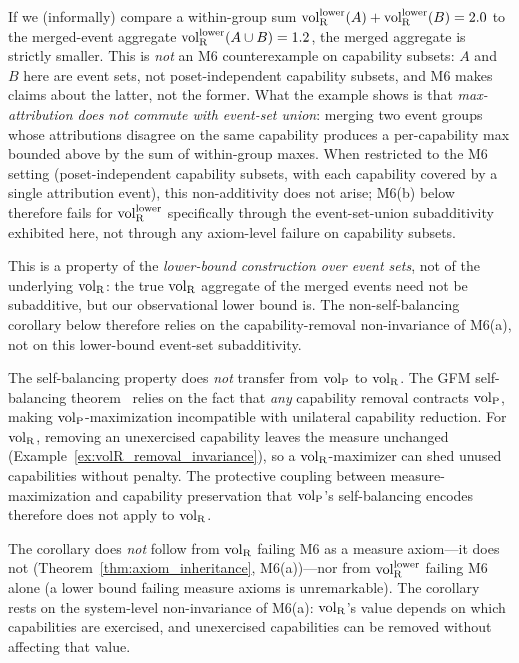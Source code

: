 \begin{example}
If we (informally) compare a within-group sum
${\operatorname{vol}_{\mathrm{R}}^{\mathrm{lower}}}(A) + {\operatorname{vol}_{\mathrm{R}}^{\mathrm{lower}}}(B) = 2.0$ to the merged-event
aggregate ${\operatorname{vol}_{\mathrm{R}}^{\mathrm{lower}}}(A \cup B) = 1.2$, the merged aggregate
is strictly smaller.  This is \emph{not} an M6 counterexample
on capability subsets: $A$ and $B$ here are event sets, not
poset-independent capability subsets, and M6 makes claims
about the latter, not the former.  What the example shows is
that \emph{max-attribution does not commute with event-set
union}: merging two event groups whose attributions disagree
on the same capability produces a per-capability max bounded
above by the sum of within-group maxes.  When restricted to
the M6 setting (poset-independent capability subsets, with
each capability covered by a single attribution event), this
non-additivity does not arise; M6(b) below therefore fails for
${\operatorname{vol}_{\mathrm{R}}^{\mathrm{lower}}}$ specifically through the event-set-union
subadditivity exhibited here, not through any axiom-level
failure on capability subsets.

This is a property of the \emph{lower-bound construction over
event sets}, not of the underlying ${\operatorname{vol}_{\mathrm{R}}}$: the true ${\operatorname{vol}_{\mathrm{R}}}$
aggregate of the merged events need not be subadditive, but
our observational lower bound is.  The non-self-balancing
corollary below therefore relies on the capability-removal
non-invariance of M6(a), not on this lower-bound
event-set subadditivity.
\end{example}

\begin{corollary}
\label{cor:not_self_balancing}
The self-balancing property does \emph{not} transfer from
${\operatorname{vol}_{\mathrm{P}}}$ to ${\operatorname{vol}_{\mathrm{R}}}$.  The GFM self-balancing
theorem~\citep[Theorem~1]{lasser2026poset} relies on the fact
that \emph{any} capability removal contracts ${\operatorname{vol}_{\mathrm{P}}}$, making
${\operatorname{vol}_{\mathrm{P}}}$-maximization incompatible with unilateral capability
reduction.  For ${\operatorname{vol}_{\mathrm{R}}}$, removing an unexercised capability
leaves the measure unchanged
(Example~\ref{ex:volR_removal_invariance}), so a
${\operatorname{vol}_{\mathrm{R}}}$-maximizer can shed unused capabilities without penalty.
The protective coupling between measure-maximization and
capability preservation that ${\operatorname{vol}_{\mathrm{P}}}$'s self-balancing encodes
therefore does not apply to ${\operatorname{vol}_{\mathrm{R}}}$.

The corollary does \emph{not} follow from ${\operatorname{vol}_{\mathrm{R}}}$ failing M6 as
a measure axiom---it does not
(Theorem~\ref{thm:axiom_inheritance}, M6(a))---nor from
${\operatorname{vol}_{\mathrm{R}}^{\mathrm{lower}}}$ failing M6 alone (a lower bound failing measure
axioms is unremarkable).  The corollary rests on the
system-level non-invariance of M6(a): ${\operatorname{vol}_{\mathrm{R}}}$'s value depends
on which capabilities are exercised, and unexercised
capabilities can be removed without affecting that value.
\end{corollary}

